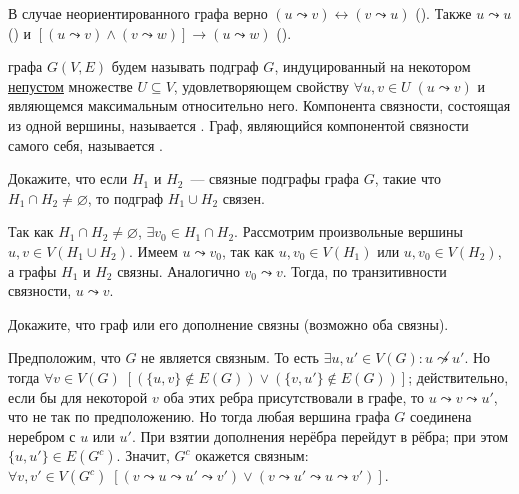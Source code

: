 \begin{remark}
    \label{remark:graphs:connectivity_relation}
    В случае неориентированного графа верно $ (u \leadsto v) \leftrightarrow (v \leadsto u) $ ().
    Также $ u \leadsto u $ () и $ \left[ (u \leadsto v) \wedge (v \leadsto w) \right] \rightarrow (u \leadsto w) $ ().
\end{remark}

\begin{definition}
    \label{definition:graphs:connectivity_component}
     графа $ G(V, E) $ будем называть подграф $ G $, индуцированный на некотором \underline{непустом} множестве $ U \subseteq V $,
    удовлетворяющем свойству $ \forall u, v \in U \; (u \leadsto v) $ и являющемся максимальным относительно него.
    Компонента связности, состоящая из одной вершины, называется .
    Граф, являющийся компонентой связности самого себя, называется .
\end{definition}


\begin{Exercise}[counter=SecExercise, label={exercise:graphs:connected_graphs_union}]
    \noindent
    Докажите, что если $ H_1 $ и $ H_2 $~--- связные подграфы графа $ G $,
    такие что $ H_1 \cap H_2 \neq \varnothing $, то подграф $ H_1 \cup H_2 $ связен.
\end{Exercise}

\begin{Answer}
    \noindent
    Так как $ H_1 \cap H_2 \neq \varnothing $, $ \exists v_0 \in H_1 \cap H_2 $.
    Рассмотрим произвольные вершины $ u, v \in V(H_1 \cup H_2) $.
    Имеем $ u \leadsto v_0 $, так как $ u, v_0 \in V(H_1) $ или $ u, v_0 \in V(H_2) $,
    а графы $ H_1 $ и $ H_2 $ связны.
    Аналогично $ v_0 \leadsto v $.
    Тогда, по транзитивности связности, $ u \leadsto v $.
\end{Answer}


\begin{Exercise}[counter=SecExercise, label={exercise:graphs:graph_or_complement_connected}]
    \noindent
    Докажите, что граф или его дополнение связны (возможно оба связны).
\end{Exercise}

\begin{Answer}
    \noindent
    Предположим, что $ G $ не является связным.
    То есть $ \exists u, u' \in V(G): u \not\leadsto u' $.
    Но тогда $ \forall v \in V(G) \; \left[ (\{u, v\} \notin E(G)) \vee (\{v, u'\} \notin E(G)) \right] $;
    действительно, если бы для некоторой $ v $ оба этих ребра присутствовали в графе, то $ u \leadsto v \leadsto u' $,
    что не так по предположению.
    Но тогда любая вершина графа $ G $ соединена неребром с $ u $ или $ u' $.
    При взятии дополнения нерёбра перейдут в рёбра;
    при этом $ \{u, u'\} \in E(G^c) $.
    Значит, $ G^c $ окажется связным: $ \forall v, v' \in V(G^c) \; \left[ (v \leadsto u \leadsto u' \leadsto v') \vee (v \leadsto u' \leadsto u \leadsto v') \right] $.
\end{Answer}


